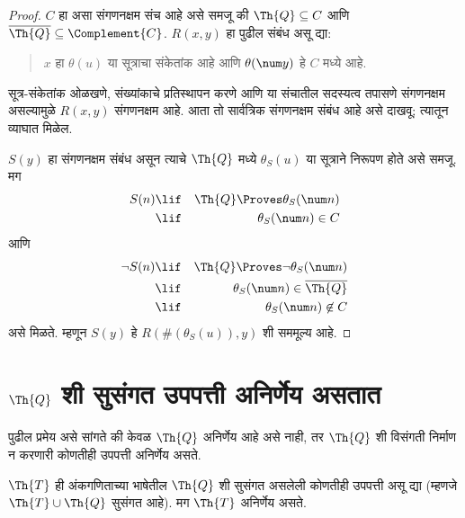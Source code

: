 \begin{proof}
$C$ हा असा संगणनक्षम संच आहे असे समजू की
$\Th{Q} \subseteq C$ आणि
$\overline{\Th{Q}} \subseteq \Complement{C}$.
$R(x,y)$ हा पुढील संबंध असू द्या:
\begin{quote}
$x$ हा $\theta(u)$ या सूत्राचा संकेतांक आहे आणि
$\theta(\num y)$ हे $C$ मध्ये आहे.
\end{quote}
सूत्र-संकेतांक ओळखणे, संख्यांकाचे प्रतिस्थापन करणे आणि
या संचातील सदस्यत्व तपासणे संगणनक्षम असल्यामुळे $R(x,y)$
संगणनक्षम आहे. आता तो सार्वत्रिक संगणनक्षम संबंध आहे असे दाखवू;
त्यातून व्याघात मिळेल.

$S(y)$ हा संगणनक्षम संबंध असून त्याचे $\Th{Q}$ मध्ये
$\theta_S(u)$ या सूत्राने निरूपण होते असे समजू. मग
\begin{eqnarray*}
S(n) & \lif & \Th{Q} \Proves \theta_S(\num n) \\
& \lif & \theta_S(\num n) \in C
\end{eqnarray*}
आणि
\begin{eqnarray*}
\lnot S(n) & \lif & \Th{Q} \Proves \lnot \theta_S(\num n) \\
& \lif & \theta_S(\num n) \in \overline{\Th{Q}} \\
& \lif & \theta_S(\num n) \not\in C
\end{eqnarray*}
असे मिळते. म्हणून $S(y)$ हे
$R(\#(\theta_S(u)),y)$ शी सममूल्य आहे.
\end{proof}












\section[Q शी सुसंगत उपपत्ती अनिर्णेय असतात]{$\Th{Q}$ शी सुसंगत उपपत्ती अनिर्णेय असतात}\label{inc:tcp:con:sec}

पुढील प्रमेय असे सांगते की केवळ $\Th{Q}$ अनिर्णेय आहे असे नाही,
तर $\Th{Q}$ शी विसंगती निर्माण न करणारी कोणतीही उपपत्ती अनिर्णेय असते.

\begin{thm}
$\Th{T}$ ही अंकगणिताच्या भाषेतील $\Th{Q}$ शी सुसंगत असलेली
कोणतीही उपपत्ती असू द्या (म्हणजे $\Th{T} \cup \Th{Q}$ सुसंगत आहे).
मग $\Th{T}$ अनिर्णेय असते.
\end{thm}

